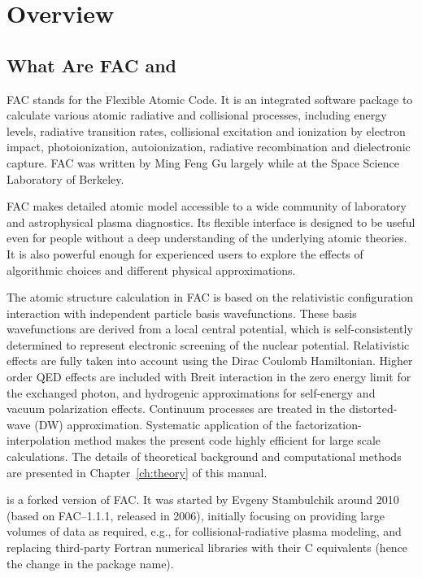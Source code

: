 \chapter{Overview}
\label{cha:overview}

\section{What Are FAC and \cFAC}
FAC stands for the Flexible Atomic Code. It is an integrated software package to
calculate various atomic radiative and collisional processes, including energy
levels, radiative transition rates, collisional excitation and  ionization by
electron impact, photoionization, autoionization, radiative recombination and
dielectronic capture. FAC was written by Ming Feng Gu largely while at the Space
Science Laboratory of Berkeley. 

FAC makes detailed atomic model accessible to a wide community of laboratory and
astrophysical plasma diagnostics. Its flexible interface is designed to be
useful even for people without a deep understanding of the underlying atomic
theories. It is also powerful enough for experienced users to explore the
effects of algorithmic choices and different physical approximations.

The atomic structure calculation in FAC is based on the relativistic
configuration interaction with independent particle basis wavefunctions. These
basis wavefunctions are derived from a local central potential, which is
self-consistently determined to represent electronic screening of the nuclear
potential. Relativistic effects are fully taken into account using the Dirac
Coulomb Hamiltonian. Higher order QED effects are included with Breit
interaction in the zero energy limit for the exchanged photon, and hydrogenic
approximations for self-energy and vacuum polarization effects. Continuum
processes are treated in the distorted-wave (DW) approximation. Systematic
application of the factorization-interpolation method
makes the present code highly efficient for large scale calculations. The
details of theoretical background and computational methods are presented in
Chapter~\ref{ch:theory} of this manual.

\cFAC is a forked version of FAC. It was started by Evgeny Stambulchik
around 2010 (based on FAC--1.1.1, released in 2006), initially focusing on
providing large volumes of data as required, e.g., for collisional-radiative
plasma modeling, and replacing third-party Fortran numerical libraries with
their C equivalents (hence the change in the package name).

